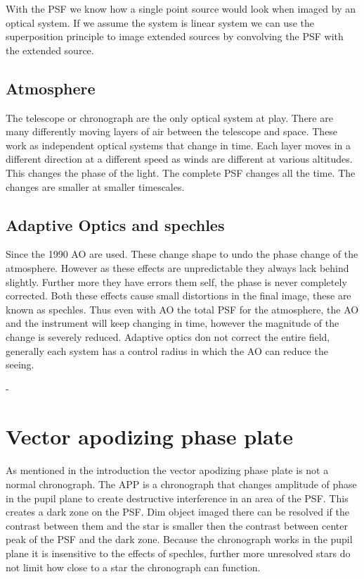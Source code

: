 With the \ac{PSF} we know how a single point source would look when imaged by an optical system. If we assume the system is linear system we can use the superposition principle to image extended sources by convolving the \ac{PSF} with the extended source. 

\subsection{Atmosphere}

The telescope or chronograph are the only optical system at play. There are many differently moving layers of air between the telescope and space. These work as independent optical systems that change in time. Each layer moves in a different direction at a different speed as winds are different at various altitudes. This changes the phase of the light. The complete \ac{PSF} changes all the time. The changes are smaller at smaller timescales. 

\subsection{Adaptive Optics and spechles}
\label{sec:ao}
Since the 1990 \ac{AO} are used. These change shape to undo the phase change of the atmosphere. However as these effects are unpredictable they always lack behind slightly. Further more they have errors them self, the phase is never completely corrected. Both these effects cause small distortions in the final image, these are known as spechles. Thus even with \ac{AO} the total \ac{PSF} for the atmosphere, the \ac{AO} and the instrument will keep changing in time, however the magnitude of the change is severely reduced. Adaptive optics don not correct the entire field, generally each system has a control radius in which the \ac{AO} can reduce the seeing.




-

\section{Vector apodizing phase plate}
\label{sec:vapp}

As mentioned in the introduction the vector apodizing phase plate is not a normal chronograph. The \ac{APP} is a chronograph that changes amplitude of phase in the pupil plane to create destructive interference in an area of the \ac{PSF}. This creates a dark zone on the \ac{PSF}. Dim object imaged there can be resolved if the contrast between them and the star is smaller then the contrast between center peak of the \ac{PSF} and the dark zone. Because the chronograph works in the pupil plane it is insensitive to the effects of spechles, further more unresolved stars do not limit how close to a star the chronograph can function. %

